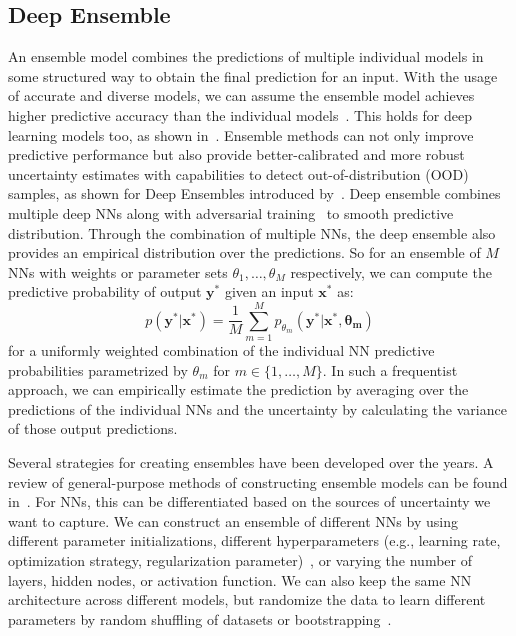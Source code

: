     \subsection{Deep Ensemble}\label{Deepsemble}
    An ensemble model combines the predictions of multiple individual models in some structured way to obtain the final prediction for an input. With the usage of accurate and diverse models, we can assume the ensemble model achieves higher predictive accuracy than the individual models~\cite{EnsembleNN}. This holds for deep learning models too, as shown in~\cite{EnsembleNN, EnsembleNN2, EnsembleNN3}. Ensemble methods can not only improve predictive performance but also provide better-calibrated and more robust uncertainty estimates with capabilities to detect out-of-distribution (OOD) samples, as shown for Deep Ensembles introduced by~\cite{DeepEnsembleUQ}. Deep ensemble combines multiple deep NNs along with adversarial training~\cite{Adversarial} to smooth predictive distribution. Through the combination of multiple NNs, the deep ensemble also provides an empirical distribution over the predictions. So for an ensemble of $M$ NNs with weights or parameter sets $\theta_1, \ldots, \theta_M$ respectively, we can compute the predictive probability of output $\mathbf{y^*}$ given an input $\mathbf{x^*}$ as:
    \begin{equation}\label{EnsemblePred}
        p(\mathbf{y^*|x^*}) = \frac{1}{M} \sum_{m=1}^M p_{\theta_m}(\mathbf{y^*|x^*, \theta_m})
    \end{equation}
    for a uniformly weighted combination of the individual NN predictive probabilities parametrized by $\theta_m$ for $m \in \{1, \ldots, M\}$. In such a frequentist approach, we can empirically estimate the prediction by averaging over the predictions of the individual NNs and the uncertainty by calculating the variance of those output predictions.

    Several strategies for creating ensembles have been developed over the years. A review of general-purpose methods of constructing ensemble models can be found in~\cite{EnsembleReview}. For NNs, this can be differentiated based on the sources of uncertainty we want to capture. We can construct an ensemble of different NNs by using different parameter initializations, different hyperparameters (e.g., learning rate, optimization strategy, regularization parameter)~\cite{HyperparEnsUnc}, or varying the number of layers, hidden nodes, or activation function. We can also keep the same NN architecture across different models, but randomize the data to learn different parameters by random shuffling of datasets or bootstrapping~\cite{DeepEnsembleUQ, NeuBoots}.

